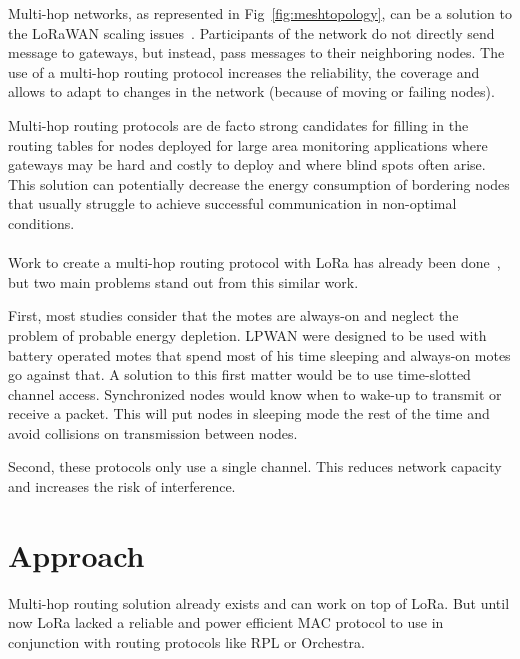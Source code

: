 

Multi-hop networks, as represented in Fig~\ref{fig:meshtopology}, can be a solution to
the LoRaWAN scaling issues~\cite{8115756}.
Participants of the network do not directly send message to gateways, but
instead, pass messages to their neighboring nodes.
The use of a multi-hop routing protocol increases the reliability, the coverage
and allows to adapt to changes in the network (because of moving or failing nodes).

Multi-hop routing protocols are de facto strong candidates for filling in the
routing tables for nodes deployed for large area monitoring
applications where gateways may be hard and costly to deploy and where blind
spots often arise.
This solution can potentially decrease the energy consumption of bordering
nodes that usually struggle to achieve successful communication in non-optimal
conditions.

\paragraph{}

Work to create a multi-hop routing protocol with LoRa has already been
done~\cite{8115756, DIAS2018424, 8856256, Abrardo_2019, duong2018},
but two main problems stand out from this similar work.

First, most studies consider that the motes are always-on and
neglect the problem of probable energy depletion.
LPWAN were designed to be used with battery operated motes that spend most of
his time sleeping and always-on motes go against that.
A solution to this first matter would be to use time-slotted channel access.
Synchronized nodes would know when to wake-up to transmit or receive a packet.
This will put nodes in sleeping mode the rest of the time and avoid collisions
on transmission between nodes.

Second, these protocols only use a single channel.
This reduces network capacity and increases the risk of
interference.

\section{Approach}

Multi-hop routing solution already exists and can work on top of LoRa.
But until now LoRa lacked a reliable and power efficient MAC protocol
to use in conjunction with routing protocols like RPL or Orchestra.

